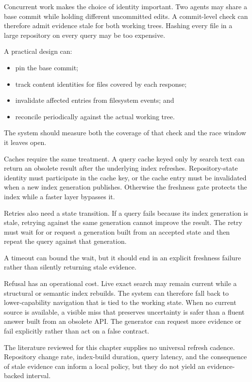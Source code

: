 Concurrent work makes the choice of identity important. Two agents may share a base commit while holding different uncommitted edits. A commit-level check can therefore admit evidence stale for both working trees. Hashing every file in a large repository on every query may be too expensive.

A practical design can:

\begin{itemize}
\tightlist
\item
  pin the base commit;
\item
  track content identities for files covered by each response;
\item
  invalidate affected entries from filesystem events; and
\item
  reconcile periodically against the actual working tree.
\end{itemize}

The system should measure both the coverage of that check and the race window it leaves open.

Caches require the same treatment. A query cache keyed only by search text can return an obsolete result after the underlying index refreshes. Repository-state identity must participate in the cache key, or the cache entry must be invalidated when a new index generation publishes. Otherwise the freshness gate protects the index while a faster layer bypasses it.

Retries also need a state transition. If a query fails because its index generation is stale, retrying against the same generation cannot improve the result. The retry must wait for or request a generation built from an accepted state and then repeat the query against that generation.

A timeout can bound the wait, but it should end in an explicit freshness failure rather than silently returning stale evidence.

Refusal has an operational cost. Live exact search may remain current while a structural or semantic index rebuilds. The system can therefore fall back to lower-capability navigation that is tied to the working state. When no current source is available, a visible miss that preserves uncertainty is safer than a fluent answer built from an obsolete API. The generator can request more evidence or fail explicitly rather than act on a false contract.

The literature reviewed for this chapter supplies no universal refresh cadence. Repository change rate, index-build duration, query latency, and the consequence of stale evidence can inform a local policy, but they do not yield an evidence-backed interval.


